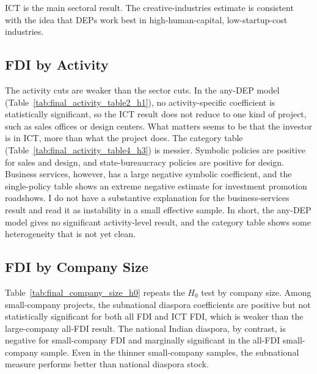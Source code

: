 \documentclass[12pt]{article}
\let\oldsubsection\subsection
\renewcommand{\subsection}{\FloatBarrier\oldsubsection}
\begin{document}
ICT is the main sectoral result. The creative-industries estimate is consistent with the idea that DEPs work best in high-human-capital, low-startup-cost industries.

\FloatBarrier
\subsection{FDI by Activity} \label{ss:activity}





The activity cuts are weaker than the sector cuts. In the any-DEP model (Table~\ref{tab:final_activity_table2_h1}), no activity-specific coefficient is statistically significant, so the ICT result does not reduce to one kind of project, such as sales offices or design centers. What matters seems to be that the investor is in ICT, more than what the project does. The category table (Table~\ref{tab:final_activity_table4_h3}) is messier. Symbolic policies are positive for sales and design, and state-bureaucracy policies are positive for design. Business services, however, has a large negative symbolic coefficient, and the single-policy table shows an extreme negative estimate for investment promotion roadshows. I do not have a substantive explanation for the business-services result and read it as instability in a small effective sample. In short, the any-DEP model gives no significant activity-level result, and the category table shows some heterogeneity that is not yet clean.

\FloatBarrier
\subsection{FDI by Company Size} \label{ss:comp size}


Table~\ref{tab:final_company_size_h0} repeats the $H_0$ test by company size. Among small-company projects, the subnational diaspora coefficients are positive but not statistically significant for both all FDI and ICT FDI, which is weaker than the large-company all-FDI result. The national Indian diaspora, by contrast, is negative for small-company FDI and marginally significant in the all-FDI small-company sample. Even in the thinner small-company samples, the subnational measure performs better than national diaspora stock.
\end{document}
